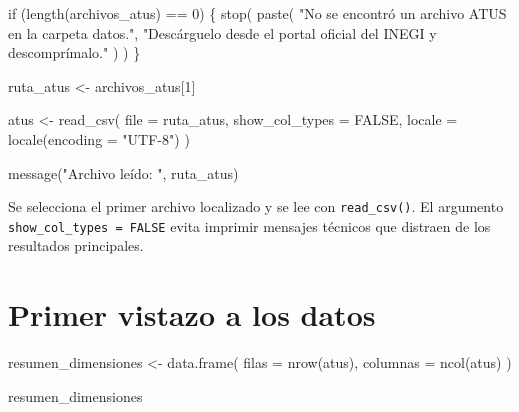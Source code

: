 \documentclass[
  spanish,
  10.5pt,
  letterpaper,
  openany,
  headings=big]{scrbook}
\newenvironment{Shaded}{}{}
\newcommand{\AttributeTok}[1]{\textcolor[rgb]{0.84,0.23,0.29}{#1}}
\newcommand{\ConstantTok}[1]{\textcolor[rgb]{0.00,0.36,0.77}{#1}}
\newcommand{\ControlFlowTok}[1]{\textcolor[rgb]{0.84,0.23,0.29}{#1}}
\newcommand{\DecValTok}[1]{\textcolor[rgb]{0.00,0.36,0.77}{#1}}
\newcommand{\FunctionTok}[1]{\textcolor[rgb]{0.44,0.26,0.76}{#1}}
\newcommand{\NormalTok}[1]{\textcolor[rgb]{0.14,0.16,0.18}{#1}}
\newcommand{\OtherTok}[1]{\textcolor[rgb]{0.44,0.26,0.76}{#1}}
\newcommand{\SpecialCharTok}[1]{\textcolor[rgb]{0.00,0.36,0.77}{#1}}
\newcommand{\StringTok}[1]{\textcolor[rgb]{0.01,0.18,0.38}{#1}}
\begin{document}
\begin{Shaded}
\begin{Highlighting}[]
\ControlFlowTok{if}\NormalTok{ (}\FunctionTok{length}\NormalTok{(archivos\_atus) }\SpecialCharTok{==} \DecValTok{0}\NormalTok{) \{}
  \FunctionTok{stop}\NormalTok{(}
    \FunctionTok{paste}\NormalTok{(}
      \StringTok{"No se encontró un archivo ATUS en la carpeta datos."}\NormalTok{,}
      \StringTok{"Descárguelo desde el portal oficial del INEGI y descomprímalo."}
\NormalTok{    )}
\NormalTok{  )}
\NormalTok{\}}

\NormalTok{ruta\_atus }\OtherTok{\textless{}{-}}\NormalTok{ archivos\_atus[}\DecValTok{1}\NormalTok{]}

\NormalTok{atus }\OtherTok{\textless{}{-}} \FunctionTok{read\_csv}\NormalTok{(}
  \AttributeTok{file =}\NormalTok{ ruta\_atus,}
  \AttributeTok{show\_col\_types =} \ConstantTok{FALSE}\NormalTok{,}
  \AttributeTok{locale =} \FunctionTok{locale}\NormalTok{(}\AttributeTok{encoding =} \StringTok{"UTF{-}8"}\NormalTok{)}
\NormalTok{)}

\FunctionTok{message}\NormalTok{(}\StringTok{"Archivo leído: "}\NormalTok{, ruta\_atus)}
\end{Highlighting}
\end{Shaded}

\begin{tcolorbox}[enhanced jigsaw, arc=.35mm, bottomrule=.15mm, bottomtitle=1mm, breakable, colback=white, colbacktitle=quarto-callout-note-color!10!white, colframe=quarto-callout-note-color-frame, coltitle=black, left=2mm, leftrule=.75mm, opacityback=0, opacitybacktitle=0.6, rightrule=.15mm, title=\textcolor{quarto-callout-note-color}{\faInfo}\hspace{0.5em}{Explicación del código}, titlerule=0mm, toprule=.15mm, toptitle=1mm]

Se selecciona el primer archivo localizado y se lee con
\texttt{read\_csv()}. El argumento \texttt{show\_col\_types\ =\ FALSE}
evita imprimir mensajes técnicos que distraen de los resultados
principales.

\end{tcolorbox}

\section{Primer vistazo a los datos}\label{primer-vistazo-a-los-datos}

\begin{Shaded}
\begin{Highlighting}[]
\NormalTok{resumen\_dimensiones }\OtherTok{\textless{}{-}} \FunctionTok{data.frame}\NormalTok{(}
  \AttributeTok{filas =} \FunctionTok{nrow}\NormalTok{(atus),}
  \AttributeTok{columnas =} \FunctionTok{ncol}\NormalTok{(atus)}
\NormalTok{)}

\NormalTok{resumen\_dimensiones}
\end{Highlighting}
\end{Shaded}
\end{document}
